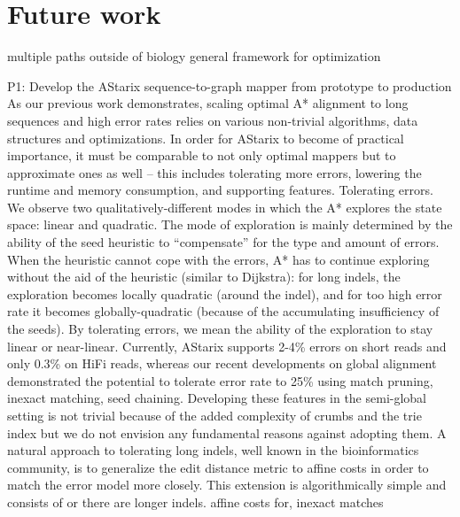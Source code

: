 \section{Future work}

multiple paths
outside of biology
general framework for optimization

P1: Develop the AStarix sequence-to-graph mapper from prototype to production
As our previous work demonstrates, scaling optimal A* alignment to long sequences and high error rates relies on various non-trivial algorithms, data structures and optimizations. In order for AStarix to become of practical importance, it must be comparable to not only optimal mappers but to approximate ones as well – this includes tolerating more errors, lowering the runtime and memory consumption, and supporting features.
Tolerating errors. We observe two qualitatively-different modes in which the A* explores the state space: linear and quadratic. The mode of exploration is mainly determined by the ability of the seed heuristic to “compensate” for the type and amount of errors. When the heuristic cannot cope with the errors, A* has to continue exploring without the aid of the heuristic (similar to Dijkstra): for long indels, the exploration becomes locally quadratic (around the indel), and for too high error rate it becomes globally-quadratic (because of the accumulating insufficiency of the seeds). By tolerating errors, we mean the ability of the exploration to stay linear or near-linear. Currently, AStarix supports 2-4\% errors on short reads and only 0.3\% on HiFi reads, whereas our recent developments on global alignment demonstrated the potential to tolerate error rate to 25\% using match pruning, inexact matching, seed chaining. Developing these features in the semi-global setting is not trivial because of the added complexity of crumbs and the trie index but we do not envision any fundamental reasons against adopting them. A natural approach to tolerating long indels, well known in the bioinformatics community, is to generalize the edit distance metric to affine costs in order to match the error model more closely. This extension is algorithmically simple and consists of or there are longer indels. affine costs for, inexact matches
